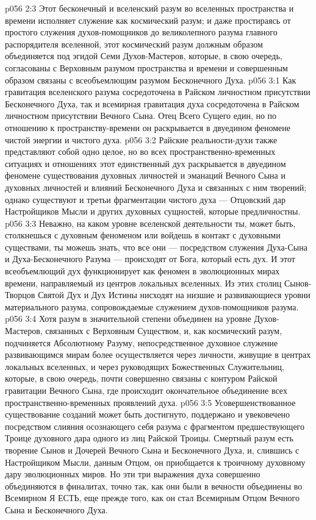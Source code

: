 \vs p056 2:3 Этот бесконечный и вселенский разум во вселенных пространства и времени исполняет служение как космический разум; и даже простираясь от простого служения духов\hyp{}помощников до великолепного разума главного распорядителя вселенной, этот космический разум должным образом объединяется под эгидой Семи Духов\hyp{}Мастеров, которые, в свою очередь, согласованы с Верховным разумом пространства и времени и совершенным образом связаны с всеобъемлющим разумом Бесконечного Духа.
\vs p056 3:1 Как гравитация вселенского разума сосредоточена в Райском личностном присутствии Бесконечного Духа, так и всемирная гравитация духа сосредоточена в Райском личностном присутствии Вечного Сына. Отец Всего Сущего един, но по отношению к пространству\hyp{}времени он раскрывается в двуедином феномене чистой энергии и чистого духа.
\vs p056 3:2 Райские реальности\hyp{}духи также представляют собой одно целое, но во всех пространственно\hyp{}временных ситуациях и отношениях этот единственный дух раскрывается в двуедином феномене существования духовных личностей и эманаций Вечного Сына и духовных личностей и влияний Бесконечного Духа и связанных с ним творений; однако существуют и третьи фрагментации чистого духа --- Отцовский дар Настройщиков Мысли и других духовных сущностей, которые предличностны.
\vs p056 3:3 \pc Неважно, на каком уровне вселенской деятельности ты, может быть, столкнешься с духовным феноменом или войдешь в контакт с духовными существами, ты можешь знать, что все они --- посредством служения Духа\hyp{}Сына и Духа\hyp{}Бесконечного Разума --- происходят от Бога, который есть дух. И этот всеобъемлющий дух функционирует как феномен в эволюционных мирах времени, направляемый из центров локальных вселенных. Из этих столиц Сынов\hyp{}Творцов Святой Дух и Дух Истины нисходят на низшие и развивающиеся уровни материального разума, сопровождаемые служением духов\hyp{}помощников разума.
\vs p056 3:4 Хотя разум в значительной степени объединен на уровне Духов\hyp{}Мастеров, связанных с Верховным Существом, и, как космический разум, подчиняется Абсолютному Разуму, непосредственное духовное служение развивающимся мирам более осуществляется через личности, живущие в центрах локальных вселенных, и через руководящих Божественных Служительниц, которые, в свою очередь, почти совершенно связаны с контуром Райской гравитации Вечного Сына, где происходит окончательное объединение всех пространственно\hyp{}временных проявлений духа.
\vs p056 3:5 \pc Усовершенствованное существование созданий может быть достигнуто, поддержано и увековечено посредством слияния осознающего себя разума с фрагментом предшествующего Троице духовного дара одного из лиц Райской Троицы. Смертный разум есть творение Сынов и Дочерей Вечного Сына и Бесконечного Духа, и, слившись с Настройщиком Мысли, данным Отцом, он приобщается к троичному духовному дару эволюционных миров. Но эти три выражения духа совершенно объединяются в финалитах, точно так, как они были в вечности объединены во Всемирном Я ЕСТЬ, еще прежде того, как он стал Всемирным Отцом Вечного Сына и Бесконечного Духа.
